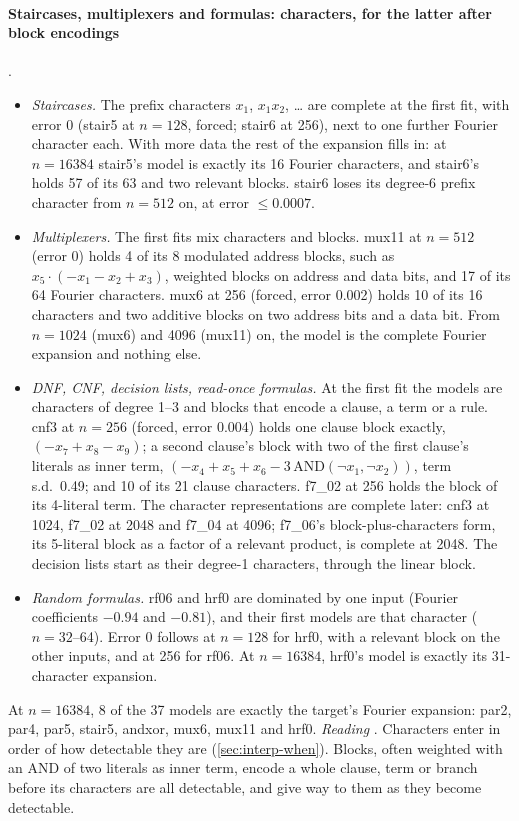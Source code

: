 \paragraph{Staircases, multiplexers and formulas: characters, for the latter after block encodings} .
\begin{itemize}
\item \emph{Staircases.} The prefix characters $x_1$, $x_1x_2$, \dots{} are complete at the first fit, with error 0 (stair5 at $n=128$, forced; stair6 at 256), next to one further Fourier character each. With more data the rest of the expansion fills in: at $n=16384$ stair5's model is exactly its 16 Fourier characters, and stair6's holds 57 of its 63 and two relevant blocks. stair6 loses its degree-6 prefix character from $n=512$ on, at error $\le0.0007$.
\item \emph{Multiplexers.} The first fits mix characters and blocks. mux11 at $n=512$ (error 0) holds 4 of its 8 modulated address blocks, such as $x_5\cdot(-x_1-x_2+x_3)$, weighted blocks on address and data bits, and 17 of its 64 Fourier characters. mux6 at 256 (forced, error 0.002) holds 10 of its 16 characters and two additive blocks on two address bits and a data bit. From $n=1024$ (mux6) and 4096 (mux11) on, the model is the complete Fourier expansion and nothing else.
\item \emph{DNF, CNF, decision lists, read-once formulas.} At the first fit the models are characters of degree 1--3 and blocks that encode a clause, a term or a rule. cnf3 at $n=256$ (forced, error 0.004) holds one clause block exactly, $(-x_7+x_8-x_9)$; a second clause's block with two of the first clause's literals as inner term, $(-x_4+x_5+x_6-3\,\mathrm{AND}(\neg x_1,\neg x_2))$, term s.d.\ 0.49; and 10 of its 21 clause characters. f7\_02 at 256 holds the block of its 4-literal term. The character representations are complete later: cnf3 at 1024, f7\_02 at 2048 and f7\_04 at 4096; f7\_06's block-plus-characters form, its 5-literal block as a factor of a relevant product, is complete at 2048. The decision lists start as their degree-1 characters, through the linear block.
\item \emph{Random formulas.} rf06 and hrf0 are dominated by one input (Fourier coefficients $-0.94$ and $-0.81$), and their first models are that character ($n=32$--64). Error 0 follows at $n=128$ for hrf0, with a relevant block on the other inputs, and at 256 for rf06. At $n=16384$, hrf0's model is exactly its 31-character expansion.
\end{itemize}
At $n=16384$, 8 of the 37 models are exactly the target's Fourier expansion: par2, par4, par5, stair5, andxor, mux6, mux11 and hrf0. \emph{Reading} . Characters enter in order of how detectable they are (\cref{sec:interp-when}). Blocks, often weighted with an AND of two literals as inner term, encode a whole clause, term or branch before its characters are all detectable, and give way to them as they become detectable.

